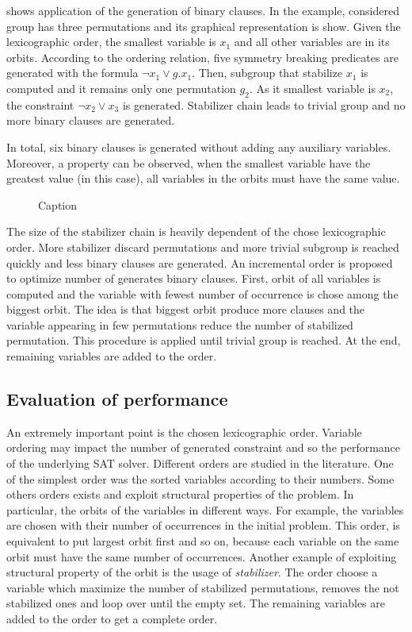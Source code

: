  shows application of the generation of binary clauses.
In the example, considered group has three permutations and its graphical representation
is show. Given the lexicographic order, the smallest variable is $x_1$ and 
all other variables are in its orbits. According to the ordering relation, five 
symmetry breaking predicates are generated with the formula $\neg x_1 \lor g.x_1$.
Then, subgroup that stabilize $x_1$ is computed and it remains only one permutation $g_2$.
As it smallest variable is $x_2$, the constraint $\neg x_2 \lor x_3$ is generated.
Stabilizer chain leads to trivial group and no more binary clauses are generated.

In total, six binary clauses is generated without adding any auxiliary variables.
Moreover, a property can be observed, when the smallest variable have the greatest value 
(\true in this case), all variables in the orbits must have the same value.

 \begin{figure}[!htbp]
	
	\caption{Caption}
	\label{fig:binary_sbp}
\end{figure}


The size of the stabilizer chain is heavily dependent of the chose lexicographic order.
More stabilizer discard permutations and more trivial subgroup is reached quickly and less 
binary clauses are generated. An incremental order is proposed to optimize number of generates binary clauses. First, orbit of all variables is computed and the variable with fewest number of occurrence is chose among the biggest orbit. The idea is that biggest orbit produce more
clauses and the variable appearing in few permutations reduce the number of stabilized permutation. This procedure is applied until trivial group is reached. At the end, remaining variables are added to the order.



\subsection{Evaluation of performance}



An extremely important point is the chosen lexicographic order.
Variable ordering may impact the number of generated constraint and so the performance of
the underlying SAT solver. Different orders are studied in the literature. 
One of the simplest order was the sorted variables according to their numbers.
Some others orders exists and exploit structural properties of the 
problem. In particular, the orbits of the variables in different ways. For example, the variables are chosen 
with their number of occurrences in the initial problem. This order, is equivalent to put largest orbit first
and so on, because each variable on the same orbit must have the same number of occurrences.
Another example of exploiting structural property of the orbit is the usage of \emph{stabilizer}.
The order choose a variable which maximize the number of stabilized permutations, removes the not stabilized ones and loop over until the empty set. The remaining variables are added to the order to get a complete order.



